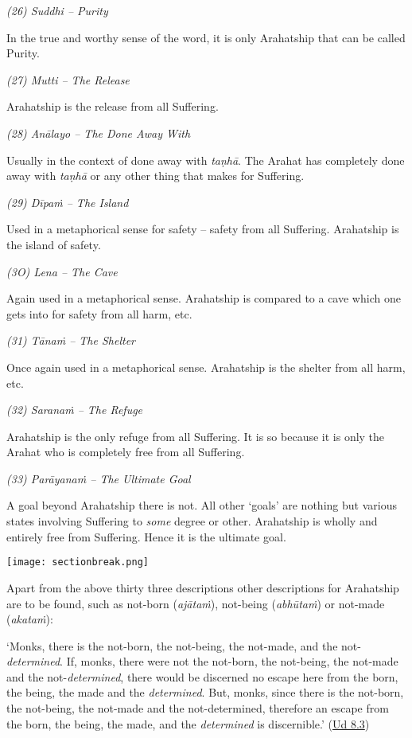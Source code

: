 \emph{(26) Suddhi -- Purity}

\protect\hypertarget{suddhi}{}{}In the true and worthy sense of the word, it is only Arahatship that can be called Purity.

\emph{(27) Mutti -- The Release}

Arahatship is the release from all Suffering.

\emph{(28) Anālayo -- The Done Away With}

Usually in the context of done away with \textit{taṇhā}. The Arahat has completely done away with \textit{taṇhā} or any other thing that makes for Suffering.

\emph{(29) Dīpaṁ -- The Island}

Used in a metaphorical sense for safety -- safety from all Suffering. Arahatship is the island of safety.

\emph{(3O) Lena -- The Cave}

Again used in a metaphorical sense. Arahatship is compared to a cave which one gets into for safety from all harm, etc.

\emph{(31) Tānaṁ -- The Shelter}

Once again used in a metaphorical sense. Arahatship is the shelter from all harm, etc.

\emph{(32) Saranaṁ -- The Refuge}

Arahatship is the only refuge from all Suffering. It is so because it is only the Arahat who is completely free from all Suffering.

\emph{(33) Parāyanaṁ -- The Ultimate Goal}

A goal beyond Arahatship there is not. All other `goals' are nothing but various states involving Suffering to \emph{some} degree or other. Arahatship is wholly and entirely free from Suffering. Hence it is the ultimate goal.

\texttt{[image: sectionbreak.png]}

Apart from the above thirty three descriptions other descriptions for Arahatship are to be found, such as not-born (\textit{ajātaṁ}), not-being (\textit{abhūtaṁ}) or not-made (\textit{akataṁ}):

`Monks, there is the not-born, the not-being, the not-made, and the not-\textit{determined}. If, monks, there were not the not-born, the not-being, the not-made and the not-\textit{determined}, there would be discerned no escape here from the born, the being, the made and the \textit{determined}. But, monks, since there is the not-born, the not-being, the not-made and the not-determined, therefore an escape from the born, the being, the made, and the \textit{determined} is discernible.' (\href{https://suttacentral.net/ud8.3/en/anandajoti}{Ud 8.3})

